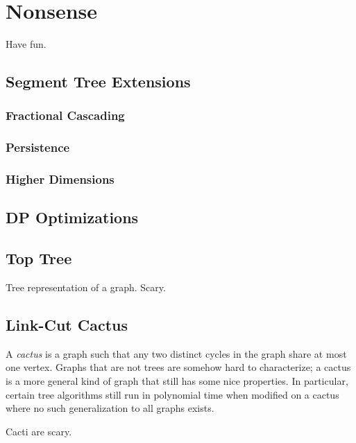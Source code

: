 \chapter{Nonsense}

Have fun.

\section{Segment Tree Extensions}

\subsection{Fractional Cascading}

\subsection{Persistence}

\subsection{Higher Dimensions}

\section{DP Optimizations}

\section{Top Tree}

Tree representation of a graph. Scary.

\section{Link-Cut Cactus}

A \textit{cactus} is a graph such that any two distinct cycles in the graph share at most one vertex. Graphs that are not trees are somehow hard to characterize; a cactus is a more general kind of graph that still has some nice properties. In particular, certain tree algorithms still run in polynomial time when modified on a cactus where no such generalization to all graphs exists.

Cacti are scary.
